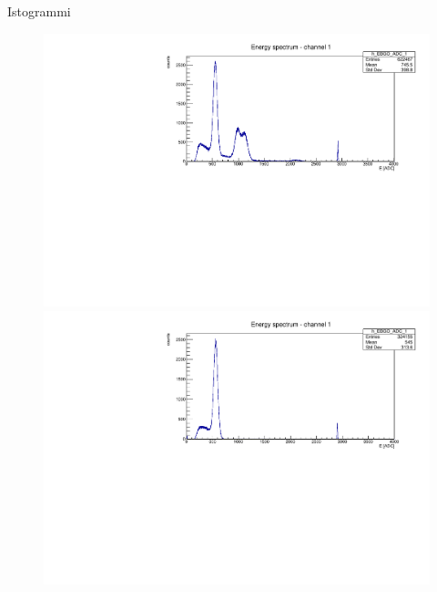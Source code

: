 \documentclass [xcolor=svgnames] {beamer}
\begin{document}
\begin{frame}{Istogrammi}
	\begin{figure}
		\centering
		\begin{minipage}{0.45\textwidth}
			\centering
			\includegraphics[width=\linewidth]{img/ex1775.pdf} %
		\end{minipage}
		\hfill
		\begin{minipage}{0.45\textwidth}
			\centering
			\includegraphics[width=\linewidth]{img/ex1776.pdf} %
		\end{minipage}
		
		\vspace{0.4cm} %
		

\end{figure}
\end{frame}
\end{document}
